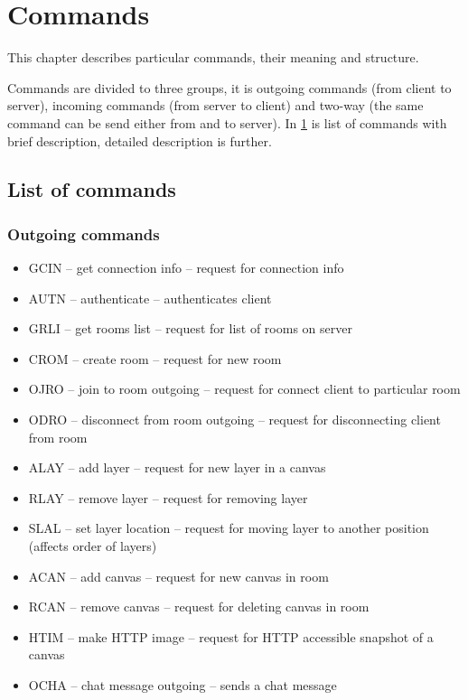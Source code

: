 \part{Commands}
\label{commands}

This chapter describes particular commands, their meaning and structure.

Commands are divided to three groups, it is outgoing commands (from client to server), incoming commands (from server to client) and two-way (the same command can be send either from and to server). In \ref{commands.list_of_commands} is list of commands with brief description, detailed description is further.

\chapter{List of commands}
\label{commands.list_of_commands}

\section{Outgoing commands}

\begin{itemize}
    \item GCIN -- get connection info -- request for connection info
    \item AUTN -- authenticate -- authenticates client
    \item GRLI -- get rooms list -- request for list of rooms on server
    \item CROM -- create room -- request for new room
    \item OJRO -- join to room outgoing -- request for connect client to particular room
    \item ODRO -- disconnect from room outgoing -- request for disconnecting client from room
    \item ALAY -- add layer -- request for new layer in a canvas
    \item RLAY -- remove layer -- request for removing layer
    \item SLAL -- set layer location -- request for moving layer to another position (affects order of layers)
    \item ACAN -- add canvas -- request for new canvas in room
    \item RCAN -- remove canvas -- request for deleting canvas in room
	\item HTIM -- make HTTP image -- request for HTTP accessible snapshot of a canvas
	\item OCHA -- chat message outgoing -- sends a chat message
\end{itemize}

